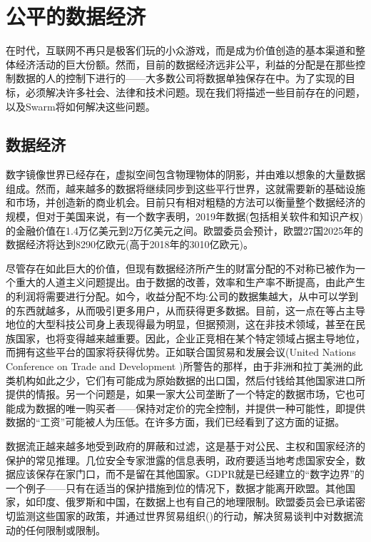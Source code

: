 \section{公平的数据经济}\label{sec:fair-data}
\green{}

在时代，互联网不再只是极客们玩的小众游戏，而是成为价值创造的基本渠道和整体经济活动的巨大份额。然而，目前的数据经济远非公平，利益的分配是在那些控制数据的人的控制下进行的——大多数公司将数据单独保存在中。为了实现的目标，必须解决许多社会、法律和技术问题。现在我们将描述一些目前存在的问题，以及Swarm将如何解决这些问题。 

\subsection{数据经济} \label{sec:dataeconomy}

数字镜像世界已经存在，虚拟空间包含物理物体的阴影，并由难以想象的大量数据\cite{MirrorWorlds2020Feb}组成。然而，越来越多的数据将继续同步到这些平行世界，这就需要新的基础设施和市场，并创造新的商业机会。目前只有相对粗糙的方法可以衡量整个数据经济的规模，但对于美国来说，有一个数字表明，2019年数据(包括相关软件和知识产权)的金融价值在1.4万亿美元到2万亿美元之间。欧盟委员会预计，欧盟27国2025年的数据经济将达到8290亿欧元(高于2018年的3010亿欧元)。 

尽管存在如此巨大的价值，但现有数据经济所产生的财富分配的不对称已被作为一个重大的人道主义问题提出。由于数据的改善，效率和生产率不断提高，由此产生的利润将需要进行分配。如今，收益分配不均:公司的数据集越大，从中可以学到的东西就越多，从而吸引更多用户，从而获得更多数据。目前，这一点在等占主导地位的大型科技公司身上表现得最为明显，但据预测，这在非技术领域，甚至在民族国家，也将变得越来越重要。因此，企业正竞相在某个特定领域占据主导地位，而拥有这些平台的国家将获得优势。正如联合国贸易和发展会议(United Nations Conference on Trade and Development \cite{TheWinner2020Feb})所警告的那样，由于非洲和拉丁美洲的此类机构如此之少，它们有可能成为原始数据的出口国，然后付钱给其他国家进口所提供的情报。另一个问题是，如果一家大公司垄断了一个特定的数据市场，它也可能成为数据的唯一购买者——保持对定价的完全控制，并提供一种可能性，即提供数据的“工资”可能被人为压低。在许多方面，我们已经看到了这方面的证据。 


数据流正越来越多地受到政府的屏蔽和过滤，这是基于对公民、主权和国家经济的保护的常见推理。几位安全专家泄露的信息表明，政府要适当地考虑国家安全，数据应该保存在家门口，而不是留在其他国家。GDPR就是已经建立的“数字边界”的一个例子——只有在适当的保护措施到位的情况下，数据才能离开欧盟。其他国家，如印度、俄罗斯和中国，在数据上也有自己的地理限制。欧盟委员会已承诺密切监测这些国家的政策，并通过世界贸易组织(\cite{EUWhitePaperAI2020Feb})的行动，解决贸易谈判中对数据流动的任何限制或限制。

